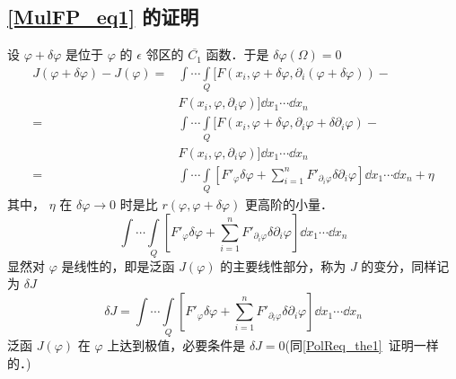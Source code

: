 \subsection{\autoref{MulFP_eq1} 的证明}
设 $\varphi+\delta\varphi$ 是位于 $\varphi$ 的 $\epsilon$ 邻区的 $\overline{C_1}$ 函数．于是 $\delta{\varphi}(\Omega)=0$
\begin{equation}
\begin{aligned}
J(\varphi+\delta\varphi)-J(\varphi)=&\int\cdots\int\limits_Q [F(x_i,\varphi+\delta\varphi,\partial_i(\varphi+\delta\varphi))-\\
&F(x_i,\varphi,\partial_i\varphi)]\dd x_1\cdots\dd x_n\\
=&\int\cdots\int\limits_Q [F(x_i,\varphi+\delta\varphi,\partial_i\varphi+\delta\partial_i\varphi)-\\
&F(x_i,\varphi,\partial_i\varphi)]\dd x_1\cdots\dd x_n\\
=&\int\cdots\int\limits_Q [F'_\varphi\delta\varphi+\sum_{i=1}^nF'_{\partial_i\varphi}\delta\partial_i\varphi]\dd x_1\cdots\dd x_n+\eta
\end{aligned}
\end{equation}
其中， $\eta$ 在 $\delta\varphi\rightarrow0$ 时是比 $r(\varphi,\varphi+\delta\varphi)$ 更高阶的小量．
\begin{equation}
\int\cdots\int\limits_Q [F'_\varphi\delta\varphi+\sum_{i=1}^nF'_{\partial_i\varphi}\delta\partial_i\varphi]\dd x_1\cdots\dd x_n
\end{equation}
显然对 $\varphi$ 是线性的，即是泛函 $J(\varphi)$ 的主要线性部分，称为 $J$ 的变分，同样记为 $\delta J$
\begin{equation}
\delta J=\int\cdots\int\limits_Q [F'_\varphi\delta\varphi+\sum_{i=1}^nF'_{\partial_i\varphi}\delta\partial_i\varphi]\dd x_1\cdots\dd x_n
\end{equation}
泛函 $J(\varphi)$ 在 $\varphi$ 上达到极值，必要条件是 $\delta J=0$(同\autoref{PolReq_the1}~证明一样的．)